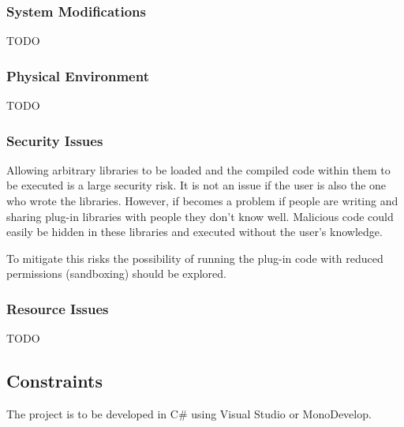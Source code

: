 \documentclass[a4paper]{article}
\begin{document}
\subsubsection{System Modifications}
TODO

\subsubsection{Physical Environment}
TODO

\subsubsection{Security Issues}
Allowing arbitrary libraries to be loaded and the compiled code within them to be executed is a large security risk. It is not an issue if the user is also the one who wrote the libraries. However, if becomes a problem if people are writing and sharing plug-in libraries with people they don't know well. Malicious code could easily be hidden in these libraries and executed without the user's knowledge.

To mitigate this risks the possibility of running the plug-in code with reduced permissions (sandboxing) should be explored.

\subsubsection{Resource Issues}
TODO

\subsection{Constraints}
The project is to be developed in C\# using Visual Studio or MonoDevelop.
\end{document}
